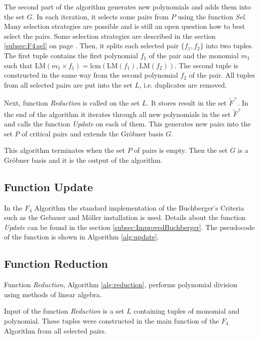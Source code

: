 The second part of the algorithm generates new polynomials and adds them into the set $G$. In each iteration, it selects some pairs from $P$ using the function \textit{Sel}. Many selection strategies are possible and is still an open question how to best select the pairs. Some selection strategies are described in the section \ref{subsec:F4:sel} on page \pageref{subsec:F4:sel}. Then, it splits each selected pair $\{f_1, f_2\}$ into two tuples. The first tuple contains the first polynomial $f_1$ of the pair and the monomial $m_1$ such that $\textrm{LM}(m_1 \times f_1) = \textrm{lcm}(\textrm{LM}(f_1),\textrm{LM}(f_2))$. The second tuple is constructed in the same way from the second polynomial $f_2$ of the pair. All tuples from all selected pairs are put into the set $L$, i.e. duplicates are removed.

Next, function \textit{Reduction} is called on the set $L$. It stores result in the set $\tilde{F}^+$. In the end of the algorithm it iterates through all new polynomials in the set $\tilde{F}^+$ and calls the function \textit{Update} on each of them. This generates new pairs into the set $P$ of critical pairs and extends the Gr\"obner basis $G$.

This algorithm terminates when the set $P$ of pairs is empty. Then the set $G$ is a Gr\"obner basis and it is the output of the algorithm.



\subsection{Function Update}
In the $F_4$ Algorithm the standard implementation of the Buchberger's Criteria such as the Gebauer and M\"oller installation \cite{Gebauer-Moller88} is used. Details about the function \textit{Update} can be found in the section \ref{subsec:ImprovedBuchberger}. The pseudocode of the function is shown in Algorithm \ref{alg:update}.

\subsection{Function Reduction}
Function \textit{Reduction}, Algorithm \ref{alg:reduction}, performs polynomial division using methods of linear algebra.

Input of the function \textit{Reduction} is a set $L$ containing tuples of monomial and polynomial. These tuples were constructed in the main function of the $F_4$ Algorithm from all selected pairs.

